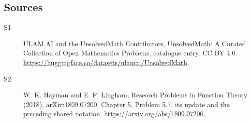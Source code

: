 \documentclass[11pt]{article}
\begin{document}
\subsection{Sources}
\begin{description}
\item[\hypertarget{source:statement:1}{S1}] ULAM.AI and the UnsolvedMath Contributors, UnsolvedMath: A Curated Collection of Open Mathematics Problems, catalogue entry. CC BY 4.0. \url{https://huggingface.co/datasets/ulamai/UnsolvedMath}.
\item[\hypertarget{source:statement:2}{S2}] W. K. Hayman and E. F. Lingham, Research Problems in Function Theory (2018), arXiv:1809.07200, Chapter 5, Problem 5.7, its update and the preceding shared notation. \url{https://arxiv.org/abs/1809.07200}.
\end{description}
\label{end:statement}
\end{document}
